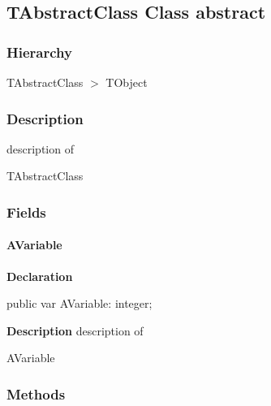 \documentclass{report}
\begin{document}
\subsection*{TAbstractClass Class abstract}
\subsubsection*{\large{\textbf{Hierarchy}}\normalsize\hspace{1ex}\hfill}
TAbstractClass {$>$} TObject
\subsubsection*{\large{\textbf{Description}}\normalsize\hspace{1ex}\hfill}
description of \begin{ttfamily}TAbstractClass\end{ttfamily}\subsubsection*{\large{\textbf{Fields}}\normalsize\hspace{1ex}\hfill}
\paragraph*{AVariable}\hspace*{\fill}

\begin{list}{}{
\setlength{\itemindent}{0cm}
\setlength{\listparindent}{0cm}
\setlength{\leftmargin}{\evensidemargin}
\addtolength{\leftmargin}{\tmplength}
\settowidth{\labelsep}{X}
\addtolength{\leftmargin}{\labelsep}
\setlength{\labelwidth}{\tmplength}
}
\begin{flushleft}
\item[\textbf{Declaration}\hfill]
\begin{ttfamily}
public var AVariable: integer;\end{ttfamily}


\end{flushleft}
\par
\item[\textbf{Description}]
description of \begin{ttfamily}AVariable\end{ttfamily}

\end{list}
\subsubsection*{\large{\textbf{Methods}}\normalsize\hspace{1ex}\hfill}
\end{document}
